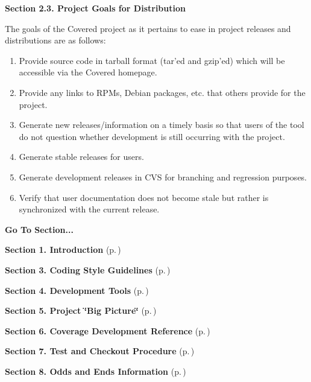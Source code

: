 \begin{Desc}
\item[{\bf Section 2.3.  Project Goals for Distribution}]\par
 The goals of the Covered project as it pertains to ease in project releases and distributions are as follows:

\begin{enumerate}
\item 
Provide source code in tarball format (tar'ed and gzip'ed) which will be accessible via the Covered homepage.\item 
Provide any links to RPMs, Debian packages, etc. that others provide for the project.\item 
Generate new releases/information on a timely basis so that users of the tool do not  question whether development is still occurring with the project.\item 
Generate stable releases for users.\item 
Generate development releases in CVS for branching and regression purposes.\item 
Verify that user documentation does not become stale but rather is synchronized with the current release.\end{enumerate}
\end{Desc}


\begin{Desc}
\item[{\bf Go To Section...}]\par
\begin{CompactItemize}
\item 
{\bf Section 1.  Introduction} {\rm (p.\,\pageref{page_intro})}\item 
{\bf Section 3.  Coding Style Guidelines} {\rm (p.\,\pageref{page_code_style})}\item 
{\bf Section 4.  Development Tools} {\rm (p.\,\pageref{page_tools})}\item 
{\bf Section 5.  Project \char`\"{}Big Picture\char`\"{}} {\rm (p.\,\pageref{page_big_picture})}\item 
{\bf Section 6.  Coverage Development Reference} {\rm (p.\,\pageref{page_code_details})}\item 
{\bf Section 7.  Test and Checkout Procedure} {\rm (p.\,\pageref{page_testing})}\item 
{\bf Section 8.  Odds and Ends Information} {\rm (p.\,\pageref{page_misc})}\end{CompactItemize}
\end{Desc}
